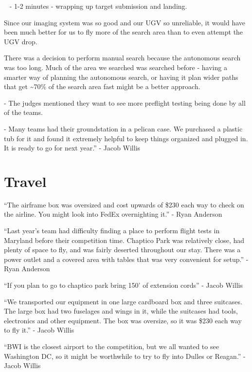 {~ - 1-2 minutes - wrapping up target submission and landing.}

{Since our imaging system was so good and our UGV so unreliable, it
would have been much better for us to fly more of the search area than
to even attempt the UGV drop.}

{There was a decision to perform manual search because the autonomous
search was too long. Much of the area we searched was searched before -
having a smarter way of planning the autonomous search, or having it
plan wider paths that get \textasciitilde{}70\% of the search area fast
might be a better approach.}

{- The judges mentioned they want to see more preflight testing being
done by all of the teams.}

{- Many teams had their groundstation in a pelican case. We purchased a
plastic tub for it and found it extremely helpful to keep things
organized and plugged in. It is ready to go for next year.'' - Jacob
Willis}

\hypertarget{h.7r3s7uwv05q3}{\section{\texorpdfstring{{Travel}}{Travel}}\label{h.7r3s7uwv05q3}}

{``The airframe box was oversized and cost upwards of \$230 each way to
check on the airline. You might look into FedEx overnighting it.'' -
Ryan Anderson}

{}

{``Last year's team had difficulty finding a place to perform flight
tests in Maryland before their competition time. Chaptico Park was
relatively close, had plenty of space to fly, and was fairly deserted
throughout our stay. There was a power outlet and a covered area with
tables that was very convenient for setup.'' - Ryan Anderson}

{}

{``If you plan to go to chaptico park bring 150' of extension cords'' -
Jacob Willis}

{}

{``We transported our equipment in one large cardboard box and three
suitcases. The large box had two fuselages and wings in it, while the
suitcases had tools, electronics and other equipment. The box was
oversize, so it was \$230 each way to fly it.'' - Jacob Willis}

{``BWI is the closest airport to the competition, but we all wanted to
see Washington DC, so it might be worthwhile to try to fly into Dulles
or Reagan.'' - Jacob Willis}

